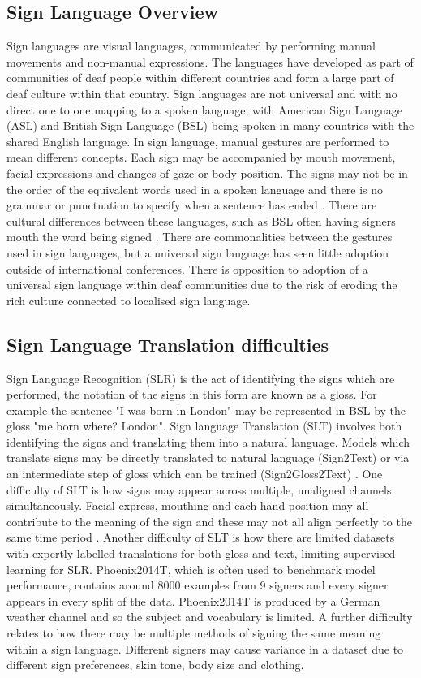\documentclass{article}
\begin{document}
\subsection{Sign Language Overview}
Sign languages are visual languages, communicated by performing manual movements and non-manual expressions. The languages have developed as part of communities of deaf people within different countries and form a large part of deaf culture within that country. Sign languages are not universal and with no direct one to one mapping to a spoken language, with American Sign Language (ASL) and British Sign Language (BSL) being spoken in many countries with the shared English language. In sign language, manual gestures are performed to mean different concepts. Each sign may be accompanied by mouth movement, facial expressions and changes of gaze or body position. The signs may not be in the order of the equivalent words used in a spoken language and there is no grammar or punctuation to specify when a sentence has ended \cite{el-alfy_comprehensive_2022} \cite{camgoz_neural_2018}. There are cultural differences between these languages, such as BSL often having signers mouth the word being signed \cite{vedaldi_bsl-1k_2020}. There are commonalities between the gestures used in sign languages, but a universal sign language has seen little adoption outside of international conferences. There is opposition to adoption of a universal sign language within deaf communities due to the risk of eroding the rich culture connected to localised sign language.\cite{bragg_sign_2019}

\subsection{Sign Language Translation difficulties}
Sign Language Recognition (SLR) is the act of identifying the signs which are performed, the notation of the signs in this form are known as a gloss. For example the sentence "I was born in London" may be represented in BSL by the gloss "me born where? London". Sign language Translation (SLT) involves both identifying the signs and translating them into a natural language. Models which translate signs may be directly translated to natural language (Sign2Text) or via an intermediate step of gloss which can be trained (Sign2Gloss2Text) \cite{zhou_gloss-free_2023}. One difficulty of SLT is how signs may appear across multiple, unaligned channels simultaneously. Facial express, mouthing and each hand position may all contribute to the meaning of the sign and these may not all align perfectly to the same time period \cite{el-alfy_comprehensive_2022}.
Another difficulty of SLT is how there are limited datasets with expertly labelled translations for both gloss and text, limiting supervised learning for SLR. Phoenix2014T, which is often used to benchmark model performance, contains around 8000 examples from 9 signers and every signer appears in every split of the data. Phoenix2014T is produced by a German weather channel and so the subject and vocabulary is limited. 
A further difficulty relates to how there may be multiple methods of signing the same meaning within a sign language. Different signers may cause variance in a dataset due to different sign preferences, skin tone, body size and clothing. 
\end{document}
